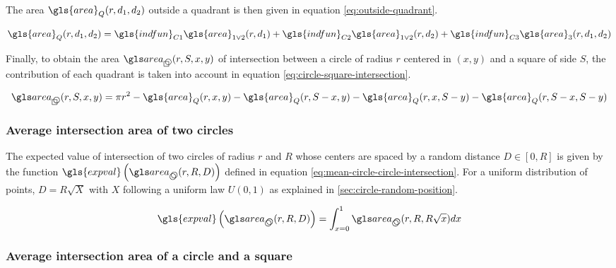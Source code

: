 \begin{appendix}
\medskip

The area \( \gls{area}_Q (r, d_1, d_2) \) outside a quadrant is then given in equation \eqref{eq:outside-quadrant}.

\begin{equation}\label{eq:outside-quadrant}
\gls{area}_Q (r, d_1, d_2) =
\gls{indfun}_{C1} \gls{area}_{1 \lor 2} (r, d_1) +
\gls{indfun}_{C2} \gls{area}_{1 \lor 2} (r, d_2) +
\gls{indfun}_{C3} \gls{area}_{3} (r, d_1, d_2)
\end{equation}

\medskip

Finally, to obtain the area \( \cirsqr (r, S, x, y) \) of intersection between a circle of radius \( r \) centered in \( (x, y) \) and a square of side \( S \), the contribution of each quadrant is taken into account in equation \eqref{eq:circle-square-intersection}.

\begin{equation}\label{eq:circle-square-intersection}
\cirsqr (r, S, x, y) = \pi r^2
- \gls{area}_Q (r,     x,     y)
- \gls{area}_Q (r, S - x,     y)
- \gls{area}_Q (r,     x, S - y)
- \gls{area}_Q (r, S - x, S - y)
\end{equation}

\subsubsection{Average intersection area of two circles}

The expected value of intersection of two circles of radius \( r \) and \( R \) whose centers are spaced by a random distance \( D \in [0, R] \) is given by the function \( \gls{expval} \left( \circir (r, R, D) \right) \) defined in equation \eqref{eq:mean-circle-circle-intersection}.
For a uniform distribution of points, \( \textstyle D = R \sqrt{X} \) with \( X \) following a uniform law \( U(0, 1) \) as explained in \ref{sec:circle-random-position}.

\begin{equation}\label{eq:mean-circle-circle-intersection}
\gls{expval} \left( \circir(r, R, D) \right) = \int_{x=0}^1
\circir (r, R, R \sqrt{x}) dx
\end{equation}


\subsubsection{Average intersection area of a circle and a square}


\end{appendix}
